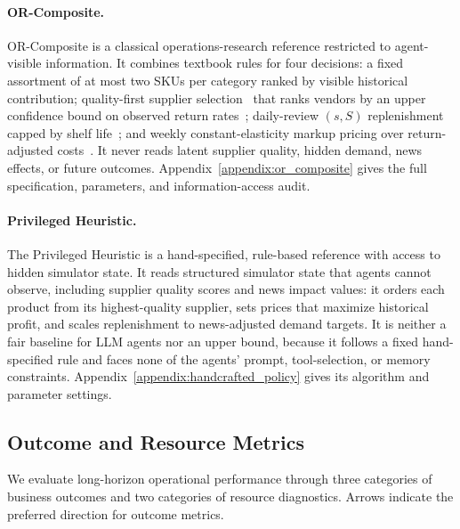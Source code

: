 \paragraph{OR-Composite.}
OR-Composite is a classical operations-research reference restricted to agent-visible information. It combines textbook rules for four decisions: a fixed assortment of at most two SKUs per category ranked by visible historical contribution; quality-first supplier selection~\citep{dickson1966vendor,weber1991vendor} that ranks vendors by an upper confidence bound on observed return rates~\citep{brown2001interval}; daily-review $(s,S)$ replenishment capped by shelf life~\citep{silver2017inventory,nahmias1982perishable}; and weekly constant-elasticity markup pricing over return-adjusted costs~\citep{phillips2021pricing}. It never reads latent supplier quality, hidden demand, news effects, or future outcomes. Appendix~\ref{appendix:or_composite} gives the full specification, parameters, and information-access audit.

\paragraph{Privileged Heuristic.}
The Privileged Heuristic is a hand-specified, rule-based reference with access to hidden simulator state. It reads structured simulator state that agents cannot observe, including supplier quality scores and news impact values: it orders each product from its highest-quality supplier, sets prices that maximize historical profit, and scales replenishment to news-adjusted demand targets. It is neither a fair baseline for LLM agents nor an upper bound, because it follows a fixed hand-specified rule and faces none of the agents' prompt, tool-selection, or memory constraints. Appendix~\ref{appendix:handcrafted_policy} gives its algorithm and parameter settings.



\subsection{Outcome and Resource Metrics}

We evaluate long-horizon operational performance through three categories of business outcomes and two categories of resource diagnostics. Arrows indicate the preferred direction for outcome metrics.

